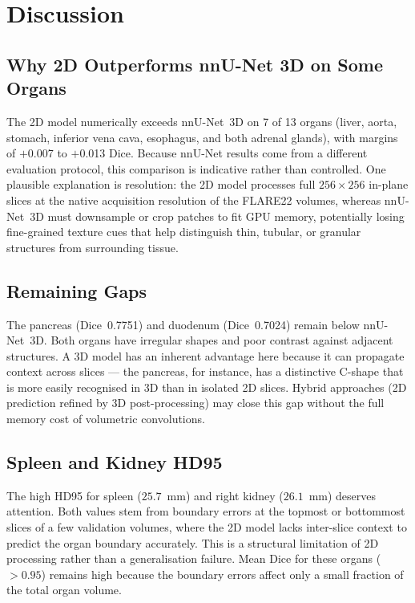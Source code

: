 \section{Discussion}

\subsection{Why 2D Outperforms nnU-Net 3D on Some Organs}

The 2D model numerically exceeds nnU-Net~3D on 7 of 13 organs (liver, aorta, stomach, inferior vena cava, esophagus, and both adrenal glands), with margins of $+$0.007 to $+$0.013 Dice. Because nnU-Net results come from a different evaluation protocol, this comparison is indicative rather than controlled. One plausible explanation is resolution: the 2D model processes full $256 \times 256$ in-plane slices at the native acquisition resolution of the FLARE22 volumes, whereas nnU-Net~3D must downsample or crop patches to fit GPU memory, potentially losing fine-grained texture cues that help distinguish thin, tubular, or granular structures from surrounding tissue.

\subsection{Remaining Gaps}

The pancreas (Dice~0.7751) and duodenum (Dice~0.7024) remain below nnU-Net~3D. Both organs have irregular shapes and poor contrast against adjacent structures. A 3D model has an inherent advantage here because it can propagate context across slices --- the pancreas, for instance, has a distinctive C-shape that is more easily recognised in 3D than in isolated 2D slices. Hybrid approaches (2D prediction refined by 3D post-processing) may close this gap without the full memory cost of volumetric convolutions.

\subsection{Spleen and Kidney HD95}

The high HD95 for spleen ($25.7$~mm) and right kidney ($26.1$~mm) deserves attention. Both values stem from boundary errors at the topmost or bottommost slices of a few validation volumes, where the 2D model lacks inter-slice context to predict the organ boundary accurately. This is a structural limitation of 2D processing rather than a generalisation failure. Mean Dice for these organs ($> 0.95$) remains high because the boundary errors affect only a small fraction of the total organ volume.

